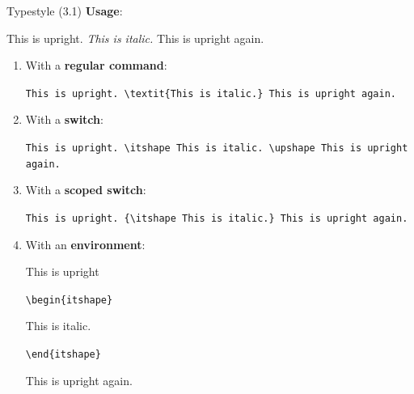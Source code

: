 \documentclass{beamer}
\newcommand{\switch}[1]{\texttt{\textbackslash#1}}
\newcommand{\command}[2]{\texttt{\textbackslash#1\{#2\}}}
\begin{document}
\begin{frame}{Typestyle (3.1)}
    \textbf{Usage}:

    \begin{center}
        This is upright. \textit{This is italic.} This is upright again.
    \end{center}

    \begin{enumerate}
        \item<only@1> With a \textbf{regular command}:

            \small\bigskip

            \texttt{This is upright. \command{textit}{This is italic.} This is upright again.}

        \item<only@2> With a \textbf{switch}:

            \small\bigskip

            \texttt{This is upright. \switch{itshape} This is italic. \switch{upshape} This is upright again.}

        \item<only@3> With a \textbf{scoped switch}:

            \small\bigskip

            \texttt{This is upright. \{\switch{itshape} This is italic.\} This is upright again.}

        \item<only@4> With an \textbf{environment}:

            \small\bigskip

            \begin{ttfamily}
                This is upright

                \command{begin}{itshape}

                \quad This is italic.

                \command{end}{itshape}

                This is upright again.
            \end{ttfamily}
    \end{enumerate}

\end{frame}
\end{document}
